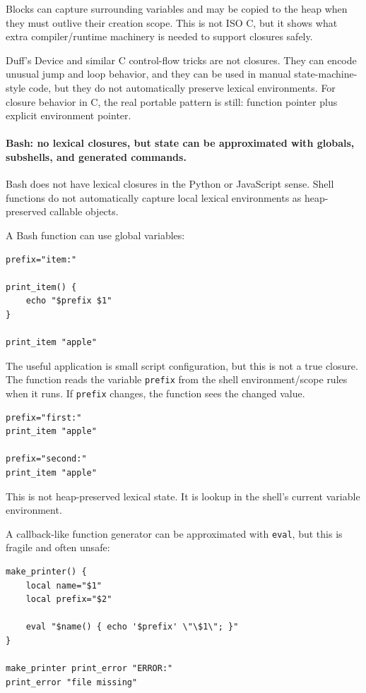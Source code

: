 Blocks can capture surrounding variables and may be copied to the heap when they must outlive their creation scope. This is not ISO C, but it shows what extra compiler/runtime machinery is needed to support closures safely.

Duff's Device and similar C control-flow tricks are not closures. They can encode unusual jump and loop behavior, and they can be used in manual state-machine-style code, but they do not automatically preserve lexical environments. For closure behavior in C, the real portable pattern is still: function pointer plus explicit environment pointer.

\paragraph{Bash: no lexical closures, but state can be approximated with globals, subshells, and generated commands.}

Bash does not have lexical closures in the Python or JavaScript sense. Shell functions do not automatically capture local lexical environments as heap-preserved callable objects.

A Bash function can use global variables:

\begin{verbatim}
prefix="item:"

print_item() {
    echo "$prefix $1"
}

print_item "apple"
\end{verbatim}

The useful application is small script configuration, but this is not a true closure. The function reads the variable \texttt{prefix} from the shell environment/scope rules when it runs. If \texttt{prefix} changes, the function sees the changed value.

\begin{verbatim}
prefix="first:"
print_item "apple"

prefix="second:"
print_item "apple"
\end{verbatim}

This is not heap-preserved lexical state. It is lookup in the shell's current variable environment.

A callback-like function generator can be approximated with \texttt{eval}, but this is fragile and often unsafe:

\begin{verbatim}
make_printer() {
    local name="$1"
    local prefix="$2"

    eval "$name() { echo '$prefix' \"\$1\"; }"
}

make_printer print_error "ERROR:"
print_error "file missing"
\end{verbatim}

